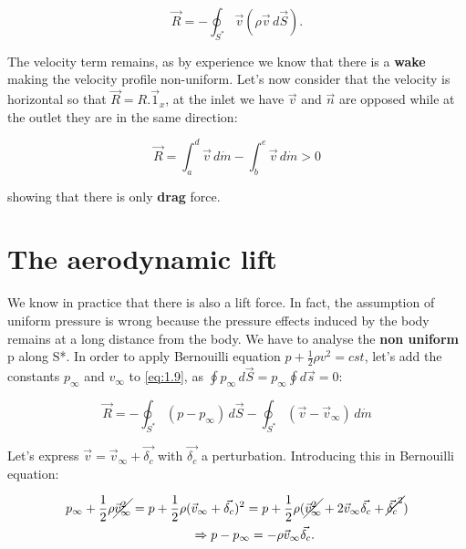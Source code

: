 				\begin{equation}
				\vec{R} = -\oint _{S^*} \vec{v} (\rho \vec{v} \, d\vec{S}).
				\end{equation}
				
				The velocity term remains, as by experience we know that there is a \textbf{wake} making the velocity profile non-uniform. Let's now consider that the velocity is horizontal so that $\vec{R} = R.\vec{1}_x$, at the inlet we have $\vec{v}$ and $\vec{n}$ are opposed while at the outlet they are in the same direction: 
				
				\begin{equation}
				\vec{R} = \int _a^d \vec{v}\, d\dot{m} - \int _b^e \vec{v}\, d\dot{m} > 0
				\end{equation}
				
				showing that there is only \textbf{drag} force.
				
		\section{The aerodynamic lift}
			We know in practice that there is also a lift force. In fact, the assumption of uniform pressure is wrong because the pressure effects induced by the body remains at a long distance from the body. We have to analyse the \textbf{non uniform} p along S*. In order to apply Bernouilli equation $p + \frac{1}{2}\rho v^2 = cst$, let's add the constants $p_\infty$ and $v_\infty$ to \eqref{eq:1.9}, as $\oint p_\infty\, d\vec{S} = p_\infty \oint d\vec{s} = 0$: 
			
			\begin{equation}
				\vec{R} = -\oint _{S^*} (p-p_\infty) \, d\vec{S} - \oint _{S^*} (\vec{v}-\vec{v}_\infty) \, d\dot{m}
				\label{eq:1.12}
			\end{equation}
			
			Let's express $\vec{v} = \vec{v}_\infty + \vec{\delta _c}$ with $\vec{\delta _c}$ a perturbation. Introducing this in Bernouilli equation: 
			
			\begin{equation}
			\begin{aligned}
			p_\infty +\frac{1}{2} \rho \cancel{\vec{v}_\infty ^2} = p + \frac{1}{2} \rho( &\vec{v}_\infty + \vec{\delta _c})^2 = p + \frac{1}{2} \rho (\cancel{\vec{v}_\infty ^2} + 2 \vec{v}_\infty \vec{\delta _c} + \cancel{\vec{\delta _c}^2}) \\
			&\Rightarrow p-p_\infty = - \rho\vec{v}_\infty \vec{\delta _c}	.		
			\end{aligned}
			\end{equation}
			
